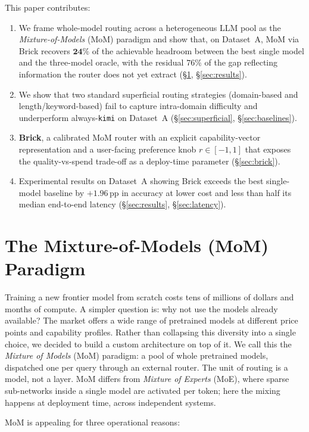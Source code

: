 \documentclass[twocolumn,10pt,a4paper]{article}
\begin{document}
This paper contributes:
\begin{enumerate}[noitemsep,topsep=3pt,leftmargin=1.4em,label=\arabic*.]
  \item We frame whole-model routing across a heterogeneous LLM pool as the \emph{Mixture-of-Models} (MoM) paradigm and show that, on Dataset~A, MoM via Brick recovers $\mathbf{24\%}$ of the achievable headroom between the best single model and the three-model oracle, with the residual $76\%$ of the gap reflecting information the router does not yet extract (§\ref{sec:mom}, §\ref{sec:results}).
  \item We show that two standard superficial routing strategies (domain-based and length/keyword-based) fail to capture intra-domain difficulty and underperform always-\texttt{kimi} on Dataset~A (§\ref{sec:superficial}, §\ref{sec:baselines}).
  \item \textbf{Brick}, a calibrated MoM router with an explicit capability-vector representation and a user-facing preference knob $r\!\in\![-1,1]$ that exposes the quality-vs-spend trade-off as a deploy-time parameter (§\ref{sec:brick}).
  \item Experimental results on Dataset~A showing Brick exceeds the best single-model baseline by $+1.96$\,pp in accuracy at lower cost and less than half its median end-to-end latency (§\ref{sec:results}, §\ref{sec:latency}).
\end{enumerate}

\section{The Mixture-of-Models (MoM) Paradigm}\label{sec:mom}
Training a new frontier model from scratch costs tens of millions of dollars and months of compute. A simpler question is: why not use the models already available? The market offers a wide range of pretrained models at different price points and capability profiles. Rather than collapsing this diversity into a single choice, we decided to build a custom architecture on top of it. We call this the \emph{Mixture of Models} (MoM) paradigm: a pool of whole pretrained models, dispatched one per query through an external router. The unit of routing is a model, not a layer. MoM differs from \emph{Mixture of Experts} (MoE), where sparse sub-networks inside a single model are activated per token; here the mixing happens at deployment time, across independent systems.

MoM is appealing for three operational reasons:
\end{document}
